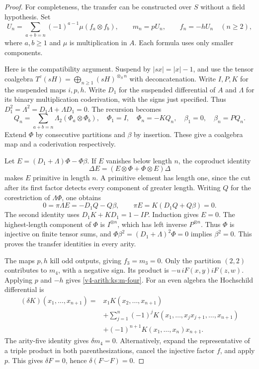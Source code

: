 \begin{proof}
For completeness, the transfer can be constructed over $S$ without a field hypothesis.
Set
\[
 U_n=\sum_{a+b=n}(-1)^{a-1}\mu(f_a\otimes f_b),\qquad
 m_n=pU_n,\qquad f_n=-hU_n\quad(n\geq2),
\]
where $a,b\geq1$ and $\mu$ is multiplication in $A$.
Each formula uses only smaller components.

Here is the compatibility argument.
Suspend by $|sx|=|x|-1$, and use the tensor coalgebra
$T^c(sH)=\bigoplus_{n\geq1}(sH)^{\otimes_S n}$ with deconcatenation.
Write $I,P,K$ for the suspended maps $i,p,h$.
Write $D_1$ for the suspended differential of $A$ and $\Lambda$
for its binary multiplication coderivation, with the signs just specified.
Thus $D_1^2=\Lambda^2=D_1\Lambda+\Lambda D_1=0$.
The recursion becomes
\[
 Q_n=\sum_{a+b=n}\Lambda_2(\Phi_a\otimes\Phi_b),\quad
 \Phi_1=I,\quad \Phi_n=-KQ_n,\quad \beta_1=0,\quad\beta_n=PQ_n.
\]
Extend $\Phi$ by consecutive partitions and $\beta$ by insertion.
These give a coalgebra map and a coderivation respectively.

Let $E=(D_1+\Lambda)\Phi-\Phi\beta$.
If $E$ vanishes below length $n$, the coproduct identity
\[
 \Delta E=(E\otimes\Phi+\Phi\otimes E)\Delta
\]
makes $E$ primitive in length $n$.
A primitive element has length one, since the cut after its first factor
detects every component of greater length.
Writing $Q$ for the corestriction of $\Lambda\Phi$, one obtains
\[
 0=\pi\Lambda E=-D_1Q-Q\beta,
 \qquad
 \pi E=K(D_1Q+Q\beta)=0.
\]
The second identity uses $D_1K+KD_1=1-IP$.
Induction gives $E=0$.
The highest-length component of $\Phi$ is $I^{\otimes n}$,
which has left inverse $P^{\otimes n}$.
Thus $\Phi$ is injective on finite tensor sums, and
$\Phi\beta^2=(D_1+\Lambda)^2\Phi=0$ implies $\beta^2=0$.
This proves the transfer identities in every arity.

The maps $p,h$ kill odd outputs, giving $f_3=m_3=0$.
Only the partition $(2,2)$ contributes to $m_4$, with a negative sign.
Its product is $-u\,iF(x,y)iF(z,w)$.
Applying $p$ and $-h$ gives \eqref{v4-arith:ks:m-four}.
For an even algebra the Hochschild differential is
\[
 \begin{split}
 (\delta K)(x_1,\ldots,x_{n+1})={}&x_1K(x_2,\ldots,x_{n+1})\\
 &+\sum_{j=1}^n(-1)^jK(x_1,\ldots,x_jx_{j+1},\ldots,x_{n+1})\\
 &+(-1)^{n+1}K(x_1,\ldots,x_n)x_{n+1}.
 \end{split}
\]
The arity-five identity gives $\delta m_4=0$.
Alternatively, expand the representative of a triple product in both
parenthesizations, cancel the injective factor $f$, and apply $p$.
This gives $\delta F=0$, hence $\delta(F\smile F)=0$.
\end{proof}

